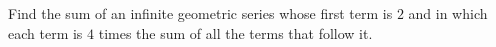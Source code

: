 Find the sum of an infinite geometric series whose first term is $2$ and in which each term is $4$ times the sum of all the terms that follow it.
